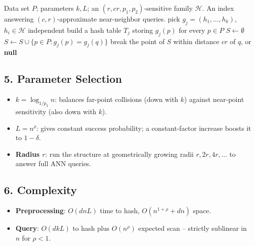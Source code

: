 \begin{algorithm}[htbp]
\caption{Locality-Sensitive Hashing: Index and Query}
\label{alg:approx_lsh}
\begin{algorithmic}[1]
\Require Data set $P$; parameters $k, L$; an $(r, cr, p_1, p_2)$-sensitive family $\mathcal{H}$.
\Ensure An index answering $(c, r)$-approximate near-neighbor queries.
    \State pick $g_j = (h_1, \dots, h_k)$, $h_i \in \mathcal{H}$ independent
    \State build a hash table $T_j$ storing $g_j(p)$ for every $p \in P$
  \EndFor
\EndFunction
{}
  \State $S \gets \emptyset$
    \State $S \gets S \cup \{p \in P : g_j(p) = g_j(q)\}$
     \State break \EndIf
  \EndFor
  \State \Return the point of $S$ within distance $cr$ of $q$, or \textbf{null}
\EndFunction
\end{algorithmic}
\end{algorithm}

\subsection{5. Parameter Selection}

\begin{itemize}
\item \textbf{$k = \log_{1/p_2} n$}: balances far-point collisions (down
  with $k$) against near-point sensitivity (also down with $k$).
\item \textbf{$L = n^{\rho}$}: gives constant success probability; a
  constant-factor increase boosts it to $1 - \delta$.
\item \textbf{Radius $r$}: run the structure at geometrically growing radii
  $r, 2r, 4r, \dots$ to answer full ANN queries.
\end{itemize}

\subsection{6. Complexity}

\begin{itemize}
\item \textbf{Preprocessing}: $O(dnL)$ time to hash, $O(n^{1+\rho} + dn)$
  space.
\item \textbf{Query}: $O(dkL)$ to hash plus $O(n^{\rho})$ expected scan --
  strictly sublinear in $n$ for $\rho < 1$.
\end{itemize}

